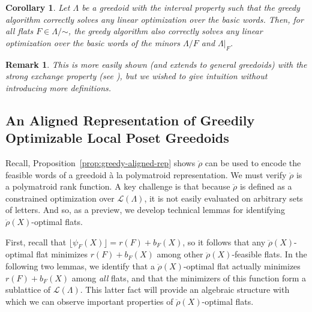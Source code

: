 \documentclass[11pt]{article}
\newtheorem{corollary}[theorem]{Corollary}
\newtheorem{remark}[theorem]{Remark}
\newcommand{\glang}{\Lambda}
\newcommand{\greedyrep}{\ddot{\rho}}
\providecommand{\L}{}
\renewcommand{\L}{\mathscr{L}}
\begin{document}
\begin{corollary}\label{cor:bsubmod} 
    Let $\glang$ be a greedoid with the interval property such that the greedy algorithm correctly solves any linear optimization over the basic words.
    Then, for all flats $F\in\glang/\mathord{\sim}$, the greedy algorithm also correctly solves any linear optimization over the basic words of the minors $\glang/F$ and $\glang|_F$.
\end{corollary}
\begin{remark}
    This is more easily shown (and extends to general greedoids) with the \emph{strong exchange property} (see \cite{korte1984greedoids,korte2012greedoids}), but we wished to give intuition without introducing more definitions.
\end{remark}
\fi
\subsection{An Aligned Representation of Greedily Optimizable Local Poset Greedoids}\label{subsec:greedy-aligned-rep}

Recall, Proposition~\ref{prop:greedy-aligned-rep} shows $\greedyrep$ can be used to encode the feasible words of a greedoid à la polymatroid representation.
We must verify $\greedyrep$ is a polymatroid rank function.
A key challenge is that because $\greedyrep$ is defined as a constrained optimization over $\L(\glang)$, it is not easily evaluated on arbitrary sets of letters.
And so, as a preview, we develop technical lemmas for identifying $\greedyrep(X)$-optimal flats.

First, recall that $\lfloor\psi_F(X)\rfloor = r(F)+b_F(X)$, so it follows that any $\greedyrep(X)$-optimal flat minimizes $r(F)+b_F(X)$ among other $\greedyrep(X)$-feasible flats.
In the following two lemmas, we identify that a $\greedyrep(X)$-optimal flat actually minimizes $r(F)+b_F(X)$ among \emph{all} flats, and that the minimizers of this function form a sublattice of $\L(\glang)$.
This latter fact will provide an algebraic structure with which we can observe important properties of $\greedyrep(X)$-optimal flats.
\end{document}
